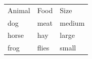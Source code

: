 \documentclass{article}
\begin{document}
	\begin{tabular}{l !{:} ll}
		Animal & Food  & Size   \\
		dog    & meat  & medium \\
		horse  & hay   & large  \\
		frog   & flies & small  \\
	\end{tabular}
\end{document}
